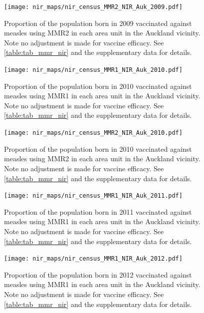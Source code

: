 \documentclass{article}
\begin{document}
% 
\begin{figure}
\begin{center}
    \texttt{[image: nir\_maps/nir\_census\_MMR2\_NIR\_Auk\_2009.pdf]}
 \end{center}
    \caption{Proportion of the population born in 2009 vaccinated against measles using MMR2 in each area unit in the Auckland vicinity. Note no adjustment is made for vaccine efficacy. See \autoref{table:tab_mmr_nir} and the supplementary data for details.}
\label{fig:fig22009_a}
\end{figure}
% 
% 
\begin{figure}
\begin{center}
    \texttt{[image: nir\_maps/nir\_census\_MMR1\_NIR\_Auk\_2010.pdf]}
\end{center}
    \caption{Proportion of the population born in 2010 vaccinated against measles using MMR1 in each area unit in the Auckland vicinity. Note no adjustment is made for vaccine efficacy. See \autoref{table:tab_mmr_nir} and the supplementary data for details.}
\label{fig:fig12010_a}
\end{figure}
% 
% 
\begin{figure}
\begin{center}
    \texttt{[image: nir\_maps/nir\_census\_MMR2\_NIR\_Auk\_2010.pdf]}
 \end{center}
    \caption{Proportion of the population born in 2010 vaccinated against measles using MMR2 in each area unit in the Auckland vicinity. Note no adjustment is made for vaccine efficacy. See \autoref{table:tab_mmr_nir} and the supplementary data for details.}
\label{fig:fig22010_a}
\end{figure}
% 
% 
\begin{figure}
\begin{center}
    \texttt{[image: nir\_maps/nir\_census\_MMR1\_NIR\_Auk\_2011.pdf]}
 \end{center}
    \caption{Proportion of the population born in 2011 vaccinated against measles using MMR1 in each area unit in the Auckland vicinity. Note no adjustment is made for vaccine efficacy. See \autoref{table:tab_mmr_nir} and the supplementary data for details.}
\label{fig:fig12011_a}
\end{figure}



\begin{figure}
\begin{center}
    \texttt{[image: nir\_maps/nir\_census\_MMR1\_NIR\_Auk\_2012.pdf]}
 \end{center}
    \caption{Proportion of the population born in 2012 vaccinated against measles using MMR1 in each area unit in the Auckland vicinity. Note no adjustment is made for vaccine efficacy. See \autoref{table:tab_mmr_nir} and the supplementary data for details.}
\label{fig:fig12012_a}
\end{figure}
\end{document}
